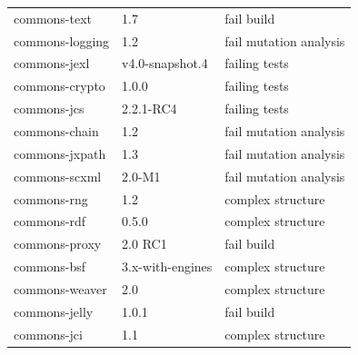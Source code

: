 \documentclass[sigconf,review,anonymous]{acmart}
\begin{document}
\begin{table}[t]
{\begin{tabular}{|l|l|l| }
    commons-text          & 1.7             & fail build \\ %
    commons-logging       & 1.2             & fail mutation analysis \\ %
    commons-jexl          & v4.0-snapshot.4 & failing tests \\
    commons-crypto        & 1.0.0           & failing tests \\
    commons-jcs           & 2.2.1-RC4       & failing tests \\
    commons-chain         & 1.2             & fail mutation analysis \\ %
    commons-jxpath        & 1.3             & fail mutation analysis \\ %
    commons-scxml         & 2.0-M1          & fail mutation analysis \\ %
    commons-rng           & 1.2             & complex structure \\ %
    commons-rdf           & 0.5.0           & complex structure \\ %
    commons-proxy         & 2.0 RC1         & fail build \\ %
    commons-bsf           & 3.x-with-engines & complex structure \\ %
    commons-weaver        & 2.0             & complex structure \\ %
    commons-jelly         & 1.0.1           & fail build \\
    commons-jci           & 1.1             & complex structure \\ %
    \hline
\end{tabular}
}
\label{tbl:fullsubjects}
\end{table}
\end{document}
